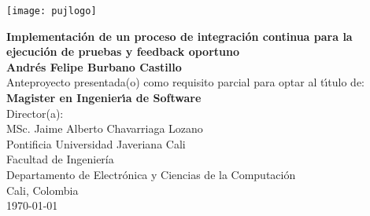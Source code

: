 \begin{center}
\thispagestyle{empty}
\vspace*{0cm}
\begin{center}
    \texttt{[image: pujlogo]}~\\[1.75cm]
\end{center}
\textbf{\huge
Implementación de un proceso de integración continua para la ejecución de pruebas y feedback oportuno}\\[1.75cm]
\Large\textbf{Andrés Felipe Burbano Castillo}\\[1.5cm]
\small Anteproyecto presentada(o) como requisito parcial para optar al
t\'{\i}tulo de:\\
\textbf{Magister en Ingenier\'{\i}a de Software}\\[1.5cm]
Director(a):\\
MSc. Jaime Alberto Chavarriaga Lozano\\[1.6cm]
Pontificia Universidad Javeriana Cali\\
Facultad de Ingeniería\\
Departamento de Electrónica y Ciencias de la Computación\\
Cali, Colombia\\
\today\\
\end{center}
